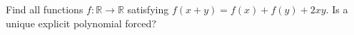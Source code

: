 Find all functions $f:\mathbb{R}\to\mathbb{R}$ satisfying $f(x+y)=f(x)+f(y)+2xy$. Is a unique explicit polynomial forced?
